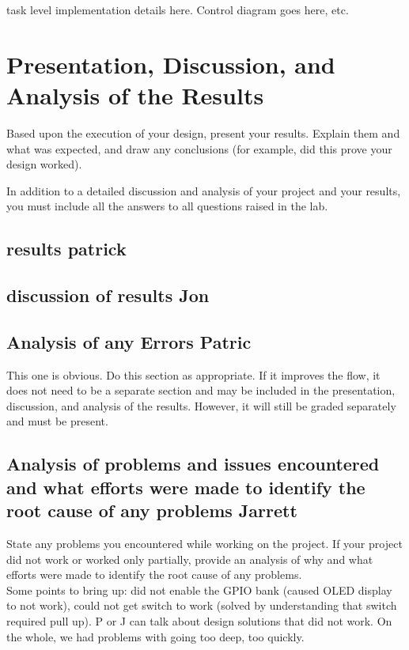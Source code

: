 \documentclass[12pt]{article} %
\begin{document}
\begin{itemize}[$$]
task level implementation details here. Control diagram goes here, etc.

\section{Presentation, Discussion, and Analysis of the Results}

Based upon the execution of your design, present your results. Explain them and what was expected, and draw any conclusions (for example, did this prove your design worked).

In addition to a detailed discussion and analysis of your project and your results, you must include all the answers to all questions raised in the lab.
\subsection{results  patrick}

\subsection{discussion of results  Jon}

\subsection{Analysis of any Errors  Patric}

This one is obvious. Do this section as appropriate.  If it improves the flow, it does not need to be a separate section and may be included in the presentation, discussion, and analysis of the results.  However, it will still be graded separately and must be present.

\subsection{Analysis of problems and issues encountered and what efforts were made to identify the root cause of any problems  Jarrett}

State any problems you encountered while working on the project. If your project did not work or worked only partially, provide an analysis of why and what efforts were made to identify the root cause of any problems. \\

Some points to bring up: did not enable the GPIO bank (caused OLED display to not work), could not get switch to work (solved by understanding that switch required pull up). P or J can talk about design solutions that did not work. On the whole, we had problems with going too deep, too quickly.


\end{itemize}
\end{document}
